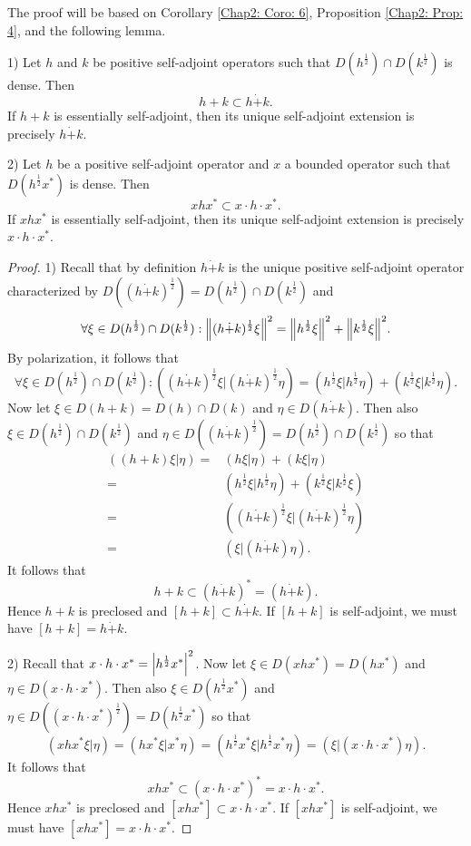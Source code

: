 The proof will be based on Corollary \ref{Chap2: Coro: 6}, Proposition \ref{Chap2: Prop: 4}, and the following lemma.
\begin{lemma}\label{Chap2: lemma: 8}
    1) Let $h$ and $k$ be positive self-adjoint operators such that $D(h^\frac{1}{2})\cap D(k^\frac{1}{2})$ is dense. Then 
    \[
       h+k\subset h\dot{+}k. 
    \]
    If $h+k$ is essentially self-adjoint, then its unique self-adjoint extension is precisely $h\dot{+}k$.\par 
2) Let $h$ be a positive self-adjoint operator and $x$ a bounded operator such that $D(h^\frac{1}{2}x^*)$ is dense. Then 
\[
    xhx^*\subset x\cdot h\cdot x^*.
\]
If $xhx^*$ is essentially self-adjoint, then its unique self-adjoint extension is precisely $x\cdot h\cdot x^*$. 
\end{lemma}
\begin{proof}
    1) Recall that by definition $h\dot{+}k$ is the unique positive self-adjoint operator characterized by $D((h\dot{+}k)^\frac{1}{2})=D(h^\frac{1}{2})\cap D(k^\frac{1}{2})$ and 
    \begin{equation}
        \forall \xi\in D(h^\frac{1}{2})\cap D(k^\frac{1}{2}):\norm{(h\dot{+}k)^\frac{1}{2}\xi}^2=\norm{h^\frac{1}{2}\xi}^2+\norm{k^\frac{1}{2}\xi}^2.
    \end{equation}
    By polarization, it follows that 
\[
    \forall \xi\in D(h^\frac{1}{2})\cap D(k^\frac{1}{2}):((h\dot{+}k)^\frac{1}{2}\xi|(h\dot{+}k)^\frac{1}{2}\eta)=(h^\frac{1}{2}\xi|h^\frac{1}{2}\eta)+(k^\frac{1}{2}\xi|k^\frac{1}{2}\eta).
\]
    Now let $\xi\in D(h+k)=D(h)\cap D(k)$ and $\eta\in D(h\dot{+}k)$. Then also $\xi\in D(h^\frac{1}{2})\cap D(k^\frac{1}{2})$ and $\eta\in D((h\dot{+}k)^\frac{1}{2})=D(h^\frac{1}{2})\cap D(k^\frac{1}{2})$ so that 
    \[
       \begin{split}
           ((h+k)\xi|\eta)=&(h\xi|\eta)+(k\xi|\eta)\\
            =&(h^\frac{1}{2}\xi|h^\frac{1}{2}\eta)+(k^\frac{1}{2}\xi|k^\frac{1}{2}\xi)\\
            =&((h\dot{+}k)^\frac{1}{2}\xi|(h\dot{+}k)^\frac{1}{2}\eta)\\
            =&(\xi|(h\dot{+}k)\eta).
       \end{split}
    \]
    It follows that 
    \[
        h+k\subset (h\dot{+}k)^*=(h\dot{+}k).
    \]
    Hence $h+k$ is preclosed and $[h+k]\subset h\dot{+}k$. If $[h+k]$ is self-adjoint, we must have $[h+k]=h\dot{+}k$.\par 
    2) Recall that $x\cdot h\cdot x^*=\abs{h^\frac{1}{2}x^*}^2$. Now let $\xi\in D(xhx^*)=D(hx^*)$ and $\eta\in D(x\cdot h\cdot x^*)$. Then also $\xi\in D(h^\frac{1}{2}x^*)$ and $\eta\in D((x\cdot h\cdot x^*)^\frac{1}{2})=D(h^\frac{1}{2}x^*)$ so that 
    \[
      (xhx^* \xi|\eta)=(hx^*\xi|x^* \eta)=(h^\frac{1}{2}x^*\xi|h^\frac{1}{2}x^*\eta)=(\xi|(x\cdot h\cdot x^*)\eta).  
    \]
    It follows that 
    \[
        xhx^*\subset(x\cdot h\cdot x^*)^*=x\cdot h\cdot x^*.
    \]
    Hence $xhx^*$ is preclosed and $[xhx^*]\subset x\cdot h\cdot x^*$. If $[xhx^*]$ is self-adjoint, we must have $[xhx^*]=x\cdot h\cdot x^*$.
\end{proof}

